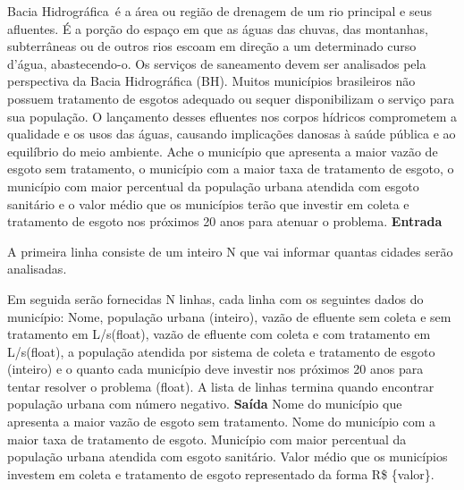 \documentclass[a4paper, 12pt]{article}
\begin{document}
Bacia Hidrográfica é a área ou região de drenagem de um rio principal e seus afluentes. É a porção do espaço em que as águas das chuvas, das montanhas, subterrâneas ou de outros rios escoam em direção a um determinado curso d’água, abastecendo-o. Os serviços de saneamento devem ser analisados pela perspectiva da Bacia Hidrográfica (BH).  Muitos municípios brasileiros não possuem tratamento de esgotos adequado ou sequer disponibilizam o serviço para sua população. O lançamento desses efluentes nos corpos hídricos comprometem a qualidade e os usos das águas, causando implicações danosas à saúde pública e ao equilíbrio do meio ambiente. Ache o município que apresenta a maior vazão de esgoto sem tratamento, o município com a maior taxa de tratamento de esgoto, o município com maior percentual da população urbana atendida com esgoto sanitário e o valor médio que os municípios terão que investir em coleta e tratamento de esgoto nos próximos 20 anos para atenuar o problema. 
\newline \newline
\textbf{{\large Entrada}} \newline

A primeira linha consiste de um inteiro N que vai informar quantas cidades serão analisadas.

Em seguida serão fornecidas N linhas, cada linha com os seguintes dados do município: Nome, população urbana (inteiro), vazão de efluente sem coleta e sem tratamento em L/s(float), vazão de efluente com coleta e com tratamento em L/s(float), a população atendida por sistema de coleta e tratamento de esgoto (inteiro) e o quanto cada município deve investir nos próximos 20 anos para tentar resolver o problema (float).
A lista de linhas termina quando encontrar população urbana com número negativo.
\newline \newline
\textbf{{\large Saída}} \newline
\newline
Nome do município que apresenta a maior vazão de esgoto sem tratamento. 
\newline
Nome do município com a maior taxa de tratamento de esgoto.
\newline
Município com maior percentual da população urbana atendida com esgoto sanitário.
\newline
Valor médio que os municípios investem em coleta e tratamento de esgoto representado da forma R\$ \{valor\}.
\newline \newline
\end{document}
